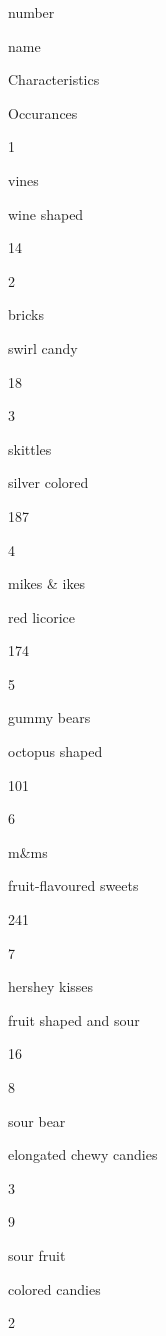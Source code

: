 \documentclass[]{article}
\newenvironment{Shaded}{\begin{snugshade}}{\end{snugshade}}
\newcommand{\KeywordTok}[1]{\textcolor[rgb]{0.13,0.29,0.53}{\textbf{#1}}}
\newcommand{\DataTypeTok}[1]{\textcolor[rgb]{0.13,0.29,0.53}{#1}}
\newcommand{\DecValTok}[1]{\textcolor[rgb]{0.00,0.00,0.81}{#1}}
\newcommand{\StringTok}[1]{\textcolor[rgb]{0.31,0.60,0.02}{#1}}
\newcommand{\OperatorTok}[1]{\textcolor[rgb]{0.81,0.36,0.00}{\textbf{#1}}}
\newcommand{\NormalTok}[1]{#1}
\begin{document}
\begin{Shaded}
\end{Shaded}

number

name

Characteristics

Occurances

1

vines

wine shaped

14

2

bricks

swirl candy

18

3

skittles

silver colored

187

4

mikes \& ikes

red licorice

174

5

gummy bears

octopus shaped

101

6

m\&ms

fruit-flavoured sweets

241

7

hershey kisses

fruit shaped and sour

16

8

sour bear

elongated chewy candies

3

9

sour fruit

colored candies

2
\end{document}
